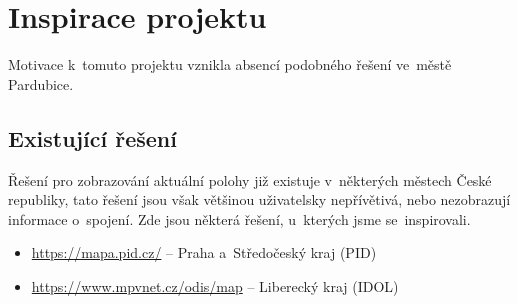 \section{Inspirace projektu} Motivace k~tomuto projektu vznikla absencí podobného řešení ve~městě Pardubice.
\subsection{Existující řešení} Řešení pro zobrazování aktuální polohy již existuje v~některých městech České republiky, tato řešení jsou však většinou uživatelsky nepřívětivá, nebo nezobrazují informace o~spojení. Zde jsou některá řešení, u~kterých jsme se~inspirovali.

\begin{itemize}
    \item \url{https://mapa.pid.cz/} – Praha a~Středočeský kraj (PID)
    \item \url{https://www.mpvnet.cz/odis/map} – Liberecký kraj (IDOL)
\end{itemize}
